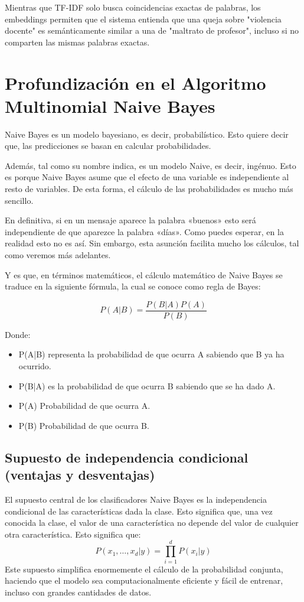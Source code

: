 Mientras que TF-IDF solo busca coincidencias exactas de palabras, los embeddings permiten que el sistema entienda que una queja sobre "violencia docente" es semánticamente similar a una de "maltrato de profesor", incluso si no comparten las mismas palabras exactas.


\section{Profundización en el Algoritmo Multinomial Naive Bayes}

Naive Bayes es un modelo bayesiano, es decir, probabilístico. Esto quiere decir que, las predicciones se basan en calcular probabilidades.

Además, tal como su nombre indica, es un modelo Naive, es decir, ingénuo. Esto es porque Naive Bayes asume que el efecto de una variable es independiente al resto de variables. De esta forma, el cálculo de las probabilidades es mucho más sencillo.

En definitiva, si en un mensaje aparece la palabra «buenos» esto será independiente de que aparezce la palabra «días». Como puedes esperar, en la realidad esto no es así. Sin embargo, esta asunción facilita mucho los cálculos, tal como veremos más adelantes.

Y es que, en términos matemáticos, el cálculo matemático de Naive Bayes se traduce en la siguiente fórmula, la cual se conoce como regla de Bayes:

\begin{equation}
P(A|B) = \frac{P(B|A)P(A)}{P(B)}
\end{equation}

Donde: 
\begin{itemize}
\item P(A|B) representa la probabilidad de que ocurra A sabiendo que B ya ha ocurrido.
\item P(B|A) es la probabilidad de que ocurra B sabiendo que se ha dado A.
\item P(A) Probabilidad de que ocurra A.
\item P(B) Probabilidad de que ocurra B.
\end{itemize}



\subsection{Supuesto de independencia condicional (ventajas y desventajas)}

El supuesto central de los clasificadores Naive Bayes es la independencia condicional de las características dada la clase.  Esto significa que, una vez conocida la clase, el valor de una característica no depende del valor de cualquier otra característica. 
Esto significa que:
\begin{equation}
P(x_1, \dots, x_d | y) = \prod_{i=1}^d P(x_i | y)
\end{equation}
Este supuesto simplifica enormemente el cálculo de la probabilidad conjunta, haciendo que el modelo sea computacionalmente eficiente y fácil de entrenar, incluso con grandes cantidades de datos. 


